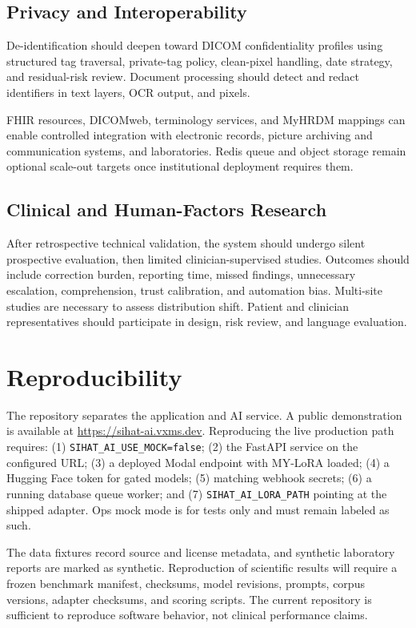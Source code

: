 \documentclass[conference]{IEEEtran}
\begin{document}
\subsection{Privacy and Interoperability}

De-identification should deepen toward DICOM confidentiality profiles using structured tag traversal, private-tag policy, clean-pixel handling, date strategy, and residual-risk review. Document processing should detect and redact identifiers in text layers, OCR output, and pixels.

FHIR resources, DICOMweb, terminology services, and MyHRDM mappings can enable controlled integration with electronic records, picture archiving and communication systems, and laboratories. Redis queue and object storage remain optional scale-out targets once institutional deployment requires them.

\subsection{Clinical and Human-Factors Research}

After retrospective technical validation, the system should undergo silent prospective evaluation, then limited clinician-supervised studies. Outcomes should include correction burden, reporting time, missed findings, unnecessary escalation, comprehension, trust calibration, and automation bias. Multi-site studies are necessary to assess distribution shift. Patient and clinician representatives should participate in design, risk review, and language evaluation.

\section{Reproducibility}

The repository separates the application and AI service. A public demonstration is available at \url{https://sihat-ai.vxms.dev}. Reproducing the live production path requires: (1) \texttt{SIHAT\_AI\_USE\_MOCK=false}; (2) the FastAPI service on the configured URL; (3) a deployed Modal endpoint with MY-LoRA loaded; (4) a Hugging Face token for gated models; (5) matching webhook secrets; (6) a running database queue worker; and (7) \texttt{SIHAT\_AI\_LORA\_PATH} pointing at the shipped adapter. Ops mock mode is for tests only and must remain labeled as such.

The data fixtures record source and license metadata, and synthetic laboratory reports are marked as synthetic. Reproduction of scientific results will require a frozen benchmark manifest, checksums, model revisions, prompts, corpus versions, adapter checksums, and scoring scripts. The current repository is sufficient to reproduce software behavior, not clinical performance claims.
\end{document}
